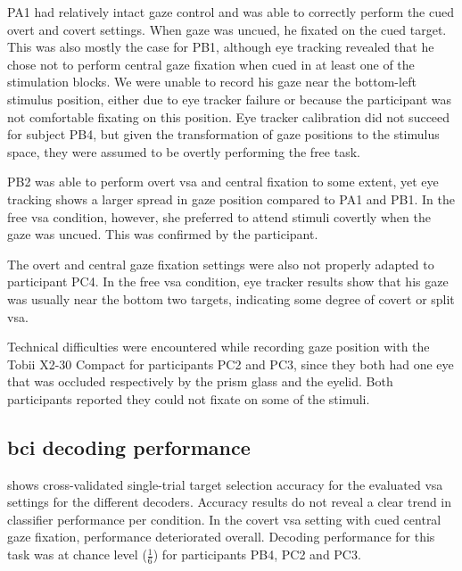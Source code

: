 \documentclass[twocolumn]{article}
\begin{document}
PA1 had relatively intact gaze control and was able to correctly perform the
cued overt and covert settings.
When gaze was uncued, he fixated on the cued target.
This was also mostly the case for PB1, although eye tracking revealed that he
chose not to perform central gaze fixation when cued in at least one of the
stimulation blocks. We were unable to record his gaze near the bottom-left
stimulus position, either due to eye tracker failure or because the participant
was not comfortable fixating on this position.
Eye tracker calibration did not succeed for subject PB4, but given the
transformation of gaze positions to the stimulus space, they were assumed to
be overtly performing the free task.

PB2 was able to perform overt \ac{vsa} and central fixation to some extent,
yet eye tracking shows a larger spread in gaze position compared to
PA1 and PB1.
In the free \ac{vsa} condition, however, she preferred to attend
stimuli covertly when the gaze was uncued.
This was confirmed by the participant.

The overt and central gaze fixation settings were also not properly adapted to
participant PC4.
In the free \ac{vsa} condition, eye tracker results show that his gaze was usually near the
bottom two targets, indicating some degree of covert or split \ac{vsa}.

Technical difficulties were encountered while recording gaze position with the
Tobii X2-30
Compact for participants PC2 and PC3, since they both had one eye that was
occluded respectively by the prism glass and the eyelid.
Both participants reported they could not fixate on some of the
stimuli.

\subsection{\Acs{bci} decoding performance}

 shows cross-validated single-trial target selection
accuracy for the evaluated \ac{vsa} settings for the different decoders.
Accuracy results do not reveal a clear trend in classifier performance per
condition.
In the covert \ac{vsa} setting with cued central gaze fixation, performance
deteriorated overall.
Decoding performance for this task was at chance level ($\frac{1}{6}$) for
participants PB4, PC2 and PC3.
\end{document}
